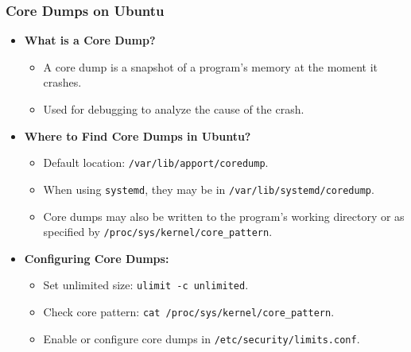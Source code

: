 \begin{frame}
\frametitle{Core Dumps on Ubuntu}

\begin{itemize}
    \item \textbf{What is a Core Dump?}
    \begin{itemize}
        \item A core dump is a snapshot of a program's memory at the moment it crashes.
        \item Used for debugging to analyze the cause of the crash.
    \end{itemize}

    \item \textbf{Where to Find Core Dumps in Ubuntu?}
    \begin{itemize}
        \item Default location: \texttt{/var/lib/apport/coredump}.
        \item When using \texttt{systemd}, they may be in \texttt{/var/lib/systemd/coredump}.
        \item Core dumps may also be written to the program's working directory or as specified by \texttt{/proc/sys/kernel/core\_pattern}.
    \end{itemize}

    \item \textbf{Configuring Core Dumps:}
    \begin{itemize}
        \item Set unlimited size: \texttt{ulimit -c unlimited}.
        \item Check core pattern: \texttt{cat /proc/sys/kernel/core\_pattern}.
        \item Enable or configure core dumps in \texttt{/etc/security/limits.conf}.
    \end{itemize}
\end{itemize}

\end{frame}



